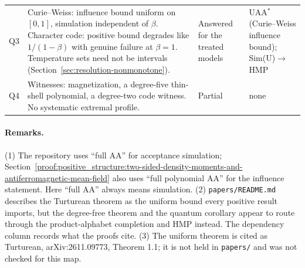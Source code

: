 \begin{longtable}{@{}p{}p{}p{}p{}@{}}
Q3 & Curie--Weiss: influence bound uniform on \([0,1]\), simulation independent of \(\beta\). Character code: positive bound degrades like \(1/(1-\beta)\) with genuine failure at \(\beta=1\). Temperature sets need not be intervals (Section~\ref{sec:resolution-nonmonotone}). & Answered for the treated models & UAA\(^*\) (Curie--Weiss influence bound); Sim(U)\(\to\)HMP\\
Q4 & Witnesses: magnetization, a degree-five thin-shell polynomial, a degree-two code witness. No systematic extremal profile. & Partial & none\\
\bottomrule
\end{longtable}

\paragraph{Remarks.} (1) The repository uses ``full AA'' for acceptance simulation; Section~\ref{proof:positive_structure:two-sided-density-moments-and-antiferromagnetic-mean-field} also uses ``full polynomial AA'' for the influence statement. Here ``full AA'' always means simulation. (2) \texttt{papers/README.md} describes the Turturean theorem as the uniform bound every positive result imports, but the degree-free theorem and the quantum corollary appear to route through the product-alphabet completion and HMP instead. The dependency column records what the proofs cite. (3) The uniform theorem is cited as Turturean, arXiv:2611.09773, Theorem 1.1; it is not held in \texttt{papers/} and was not checked for this map.
